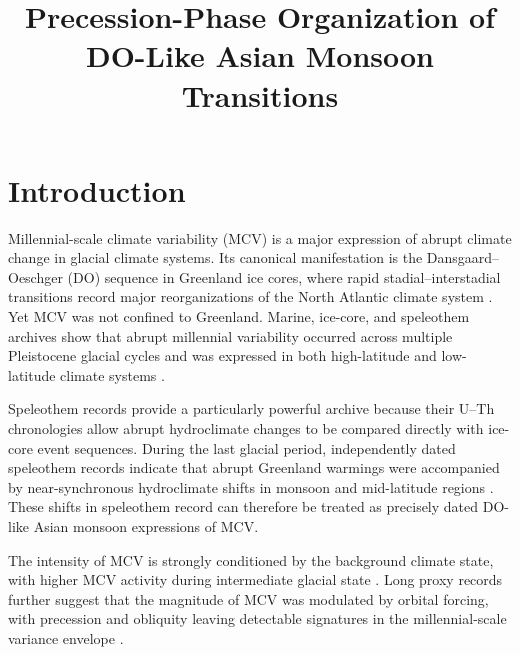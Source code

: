 \documentclass[11pt]{article}
\title{Precession-Phase Organization of DO-Like Asian Monsoon Transitions}
\author{}
\date{}
\begin{document}
\maketitle
\maketitle
\section*{Introduction}

Millennial-scale climate variability (MCV) is a major expression of abrupt climate change in glacial climate systems. Its canonical manifestation is the Dansgaard--Oeschger (DO) sequence in Greenland ice cores, where rapid stadial--interstadial transitions record major reorganizations of the North Atlantic climate system \citep{rasmussen2014}. Yet MCV was not confined to Greenland. Marine, ice-core, and speleothem archives show that abrupt millennial variability occurred across multiple Pleistocene glacial cycles and was expressed in both high-latitude and low-latitude climate systems \citep{barker2011, sun2021, hodell2023}.

Speleothem records provide a particularly powerful archive because their U--Th chronologies allow abrupt hydroclimate changes to be compared directly with ice-core event sequences. During the last glacial period, independently dated speleothem records indicate that abrupt Greenland warmings were accompanied by near-synchronous hydroclimate shifts in monsoon and mid-latitude regions \citep{corrick2020}. These shifts in speleothem record can therefore be treated as precisely dated DO-like Asian monsoon expressions of MCV.

The intensity of MCV is strongly conditioned by the background climate state, with higher MCV activity during intermediate glacial state \citep{dansgaard1993, ganopolski2001, kawamura2017, zhang2017}. Long proxy records further suggest that the magnitude of MCV was modulated by orbital forcing, with precession and obliquity leaving detectable signatures in the millennial-scale variance envelope \citep{sun2021, hodell2023, thirumalai2020}. 
\end{document}

